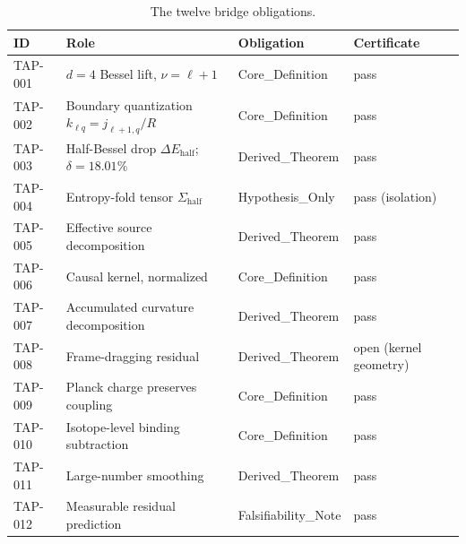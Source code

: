 \documentclass[11pt]{article}
\theoremstyle{remark}
\begin{document}
\begin{table}[ht]
\centering
\small
\caption{The twelve bridge obligations.}
\label{tab:ledger}
\begin{tabular}{llll}
\toprule
ID & Role & Obligation & Certificate \\
\midrule
TAP-001 & $d{=}4$ Bessel lift, $\nu = \ell + 1$ & Core\_Definition & pass \\
TAP-002 & Boundary quantization $k_{\ell q} = j_{\ell+1,q}/R$ & Core\_Definition & pass \\
TAP-003 & Half-Bessel drop $\Delta E_{\mathrm{half}}$; $\delta = 18.01\%$ & Derived\_Theorem & pass \\
TAP-004 & Entropy-fold tensor $\Sigma_{\mathrm{half}}$ & Hypothesis\_Only & pass (isolation) \\
TAP-005 & Effective source decomposition & Derived\_Theorem & pass \\
TAP-006 & Causal kernel, normalized & Core\_Definition & pass \\
TAP-007 & Accumulated curvature decomposition & Derived\_Theorem & pass \\
TAP-008 & Frame-dragging residual & Derived\_Theorem & open (kernel geometry) \\
TAP-009 & Planck charge preserves coupling & Core\_Definition & pass \\
TAP-010 & Isotope-level binding subtraction & Core\_Definition & pass \\
TAP-011 & Large-number smoothing & Derived\_Theorem & pass \\
TAP-012 & Measurable residual prediction & Falsifiability\_Note & pass \\
\bottomrule
\end{tabular}
\end{table}
\end{document}
